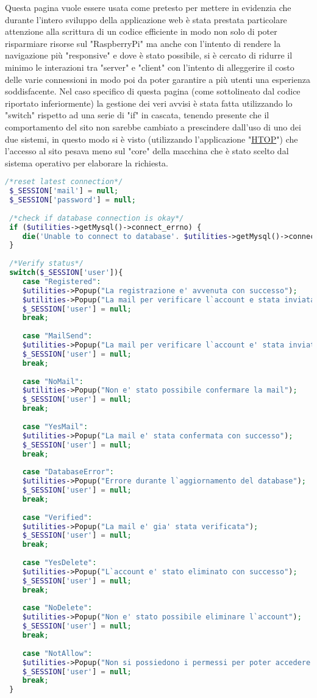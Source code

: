   Questa pagina vuole essere usata come pretesto per mettere in evidenzia che durante l'intero sviluppo della applicazione web è stata prestata particolare attenzione alla scrittura di un codice efficiente in modo non solo di poter risparmiare risorse sul "RaspberryPi" ma anche con l'intento di rendere la navigazione più "responsive" e dove è stato possibile, si è cercato di ridurre il minimo le interazioni tra "server" e "client" con l'intento di alleggerire il costo delle varie connessioni in modo poi da poter garantire a più utenti una esperienza soddisfacente. Nel caso specifico di questa pagina (come sottolineato dal codice riportato inferiormente) la gestione dei veri avvisi è stata fatta utilizzando lo "switch" rispetto ad una serie di "if" in cascata, tenendo presente che il comportamento del sito non sarebbe cambiato a prescindere dall'uso di uno dei due sistemi, in questo modo si è visto (utilizzando l'applicazione "\href{https://htop.dev/}{HTOP}") che l'accesso al sito pesava meno sul "core" della macchina che è stato scelto dal sistema operativo per elaborare la richiesta.\\
  
 \begin{lstlisting}[language=php]
 /*reset latest connection*/
 $_SESSION['mail'] = null;
 $_SESSION['password'] = null;
 
 /*check if database connection is okay*/
 if ($utilities->getMysql()->connect_errno) {
 	die('Unable to connect to database'. $utilities->getMysql()->connect_error);
 }
 
 /*Verify status*/
 switch($_SESSION['user']){
 	case "Registered":
 	$utilities->Popup("La registrazione e' avvenuta con successo");
 	$utilities->Popup("La mail per verificare l`account e stata inviata");
 	$_SESSION['user'] = null;
 	break;
 	
 	case "MailSend":
 	$utilities->Popup("La mail per verificare l`account e' stata inviata");
 	$_SESSION['user'] = null;
 	break;
 	
 	case "NoMail":
 	$utilities->Popup("Non e' stato possibile confermare la mail");
 	$_SESSION['user'] = null;
 	break;
 	
 	case "YesMail":
 	$utilities->Popup("La mail e' stata confermata con successo");
 	$_SESSION['user'] = null;
 	break;
 	
 	case "DatabaseError":
 	$utilities->Popup("Errore durante l`aggiornamento del database");
 	$_SESSION['user'] = null;
 	break;
 	
 	case "Verified":
 	$utilities->Popup("La mail e' gia' stata verificata");
 	$_SESSION['user'] = null;
 	break;
 	
 	case "YesDelete":
 	$utilities->Popup("L`account e' stato eliminato con successo");
 	$_SESSION['user'] = null;
 	break;
 	
 	case "NoDelete":
 	$utilities->Popup("Non e' stato possibile eliminare l`account");
 	$_SESSION['user'] = null;
 	break;
 	
 	case "NotAllow":
 	$utilities->Popup("Non si possiedono i permessi per poter accedere alla pagina");
 	$_SESSION['user'] = null;
 	break;
 }
\end{lstlisting}

